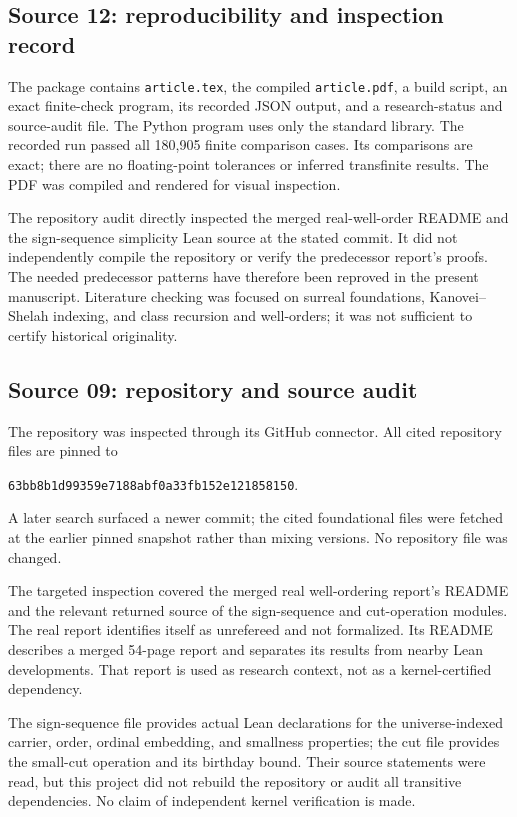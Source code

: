 \documentclass[11pt]{article}
\theoremstyle{definition}
\theoremstyle{remark}
\begin{document}
\subsection{Source 12: reproducibility and inspection record}

The package contains \texttt{article.tex}, the compiled
\texttt{article.pdf}, a build script, an exact finite-check program,
its recorded JSON output, and a research-status and source-audit file.
The Python program uses only the standard library. The recorded run
passed all 180,905 finite comparison cases. Its comparisons are exact; there are no floating-point tolerances or inferred transfinite
results. The PDF was compiled and rendered for visual inspection.

The repository audit directly inspected the merged real-well-order
README and the sign-sequence simplicity Lean source at the stated commit.
It did not independently compile the repository or verify the predecessor
report's proofs. The needed predecessor patterns have therefore been
reproved in the present manuscript. Literature checking was focused on
surreal foundations, Kanovei--Shelah indexing, and class recursion and
well-orders; it was not sufficient to certify historical originality.

\subsection{Source 09: repository and source audit}
\label{swo:ec:app:audit}
The repository was inspected through its GitHub connector. All cited
repository files are pinned to
\begin{center}
\small\texttt{63bb8b1d99359e7188abf0a33fb152e121858150}.
\end{center}
A later search surfaced a newer commit; the cited foundational files
were fetched at the earlier pinned snapshot rather than mixing versions.
No repository file was changed.

The targeted inspection covered the merged real well-ordering report's
README and the relevant returned source of the sign-sequence and
cut-operation modules. The real report identifies itself as unrefereed and not
formalized. Its README describes a merged 54-page report and separates
its results from nearby Lean developments. That report is used as
research context, not as a kernel-certified dependency.

The sign-sequence file provides actual Lean declarations for the
universe-indexed carrier, order, ordinal embedding, and smallness
properties; the cut file provides the small-cut operation and its
birthday bound. Their source statements were read, but this project did
not rebuild the repository or audit all transitive dependencies. No
claim of independent kernel verification is made.
\end{document}

